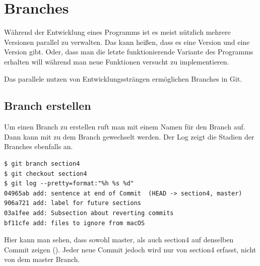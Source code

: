 \section{Branches}\label{sec:branch}
Während der Entwicklung eines Programms ist es meist nützlich mehrere Versionen parallel zu verwalten. Das kann heißen, dass es eine  Version und eine  Version gibt. Oder, dass man die letzte funktionierende Variante des Programms erhalten will während man neue Funktionen versucht zu implementieren.

Das parallele nutzen von Entwicklungssträngen ermöglichen Branches in Git.
\subsection{Branch erstellen}
Um einen Branch zu erstellen ruft man  mit einem Namen für den Branch auf. Dann kann mit  zu dem Branch gewechselt werden. Der Log zeigt die Stadien der Branches ebenfalls an.
\begin{lstlisting}
$ git branch section4
$ git checkout section4
$ git log --pretty=format:"%h %s %d"
04965ab add: sentence at end of Commit  (HEAD -> section4, master)
906a721 add: label for future sections 
03a1fee add: Subsection about reverting commits 
bf11cfe add: files to ignore from macOS 
\end{lstlisting}
Hier kann man sehen, dass sowohl master, als auch section4 auf denselben Commit zeigen (). Jeder neue Commit jedoch wird nur von section4 erfasst, nicht von dem master Branch.

